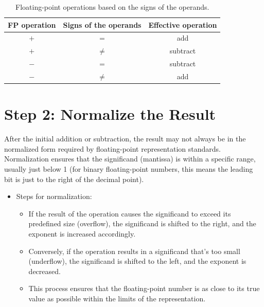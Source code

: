 \documentclass[12pt,openany, tikz,border=10pt]{book}
\begin{document}
			      	\begin{table}[h]
			      		\centering
			      		\caption*{Floating-point operations based on the signs of the operands.}
			      		\begin{tabular}{ccc}
			      			\toprule
			      			FP operation & Signs of the operands & Effective operation \\
			      			\midrule
			      			\(+\)        & \(=\)                 & add                 \\
			      			\(+\)        & \(\neq\)              & subtract            \\
			      			\(-\)        & \(=\)                 & subtract            \\
			      			\(-\)        & \(\neq\)              & add                 \\
			      			\bottomrule
			      		\end{tabular}
			      	\end{table}
			      	    
			      	\section*{Step 2: Normalize the Result}
			      	After the initial addition or subtraction, the result may not always be in the normalized form required by floating-point representation standards. Normalization ensures that the significand (mantissa) is within a specific range, usually just below 1 (for binary floating-point numbers, this means the leading bit is just to the right of the decimal point).
			      	    
			      	\begin{itemize}
			      		\item[] Steps for normalization:
			      		      \begin{itemize}
			      		      	\item If the result of the operation causes the significand to exceed its predefined size (overflow), the significand is shifted to the right, and the exponent is increased accordingly.
			      		      	\item Conversely, if the operation results in a significand that's too small (underflow), the significand is shifted to the left, and the exponent is decreased.
			      		      	\item This process ensures that the floating-point number is as close to its true value as possible within the limits of the representation.
			      		      \end{itemize}
			      	\end{itemize}
\end{document}
